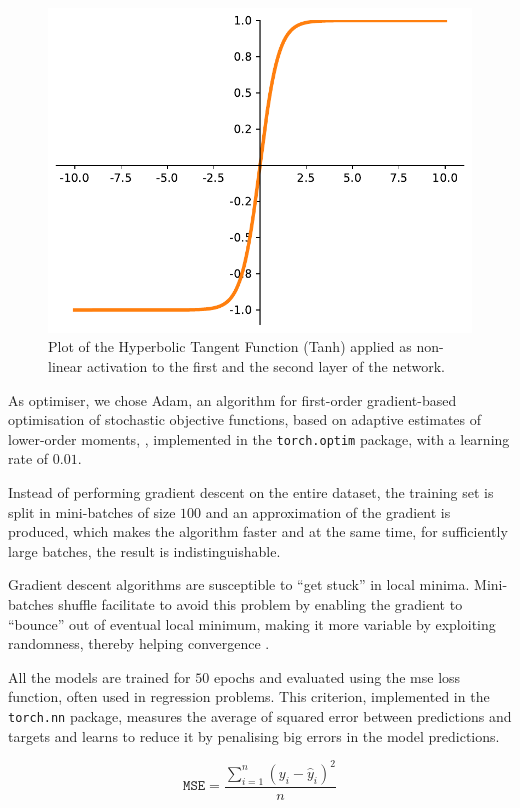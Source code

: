 \begin{figure}[!htb]
	\centering
	\includegraphics[width=.5\textwidth]{contents/images/tanh2}%
	\caption[Plot of the Tanh activation function.]{Plot of the Hyperbolic 
	Tangent Function (Tanh) applied as non-linear activation to the first and the 
	second layer of the network.}
	\label{fig:tanh}
\end{figure}

As optimiser, we chose Adam, {an algorithm for first-order gradient-based 
optimisation of stochastic objective functions, based on adaptive estimates of 
lower-order moments}, \cite[see][]{kingma2014adam, 
loshchilov2017decoupled}, implemented in the \texttt{torch.optim} package, with 
a learning rate of $0.01$. 

Instead of performing gradient descent on the entire dataset, the training set is 
split in mini-batches of size $100$ and an approximation of the gradient is 
produced, which makes the algorithm faster and at the same time, for sufficiently 
large batches, the result is indistinguishable.

Gradient descent algorithms are susceptible to ``get stuck'' in local minima.
Mini-batches shuffle facilitate to avoid this problem by enabling the gradient to 
``bounce'' out of eventual local minimum, making it more variable by exploiting 
randomness, thereby helping convergence \cite[][]{meng2019convergence}.

All the models are trained for $50$ epochs and evaluated using the \gls{mse} loss 
function, often used in regression problems. 
This criterion, implemented in the \texttt{torch.nn} package, measures the 
average of squared error between predictions and targets and learns to reduce it 
by penalising big errors in the model predictions.

\begin{Equation}[!htb]
	\centering
	\begin{equation}
	\mathtt{MSE} = \frac{\sum_{i=1}^n (y_i-\hat y_i)^2}{n}
	\end{equation}
	\caption{Mean Squared Error (\gls{mse}) loss function.}
	\label{eq:mse}
\end{Equation}
	

